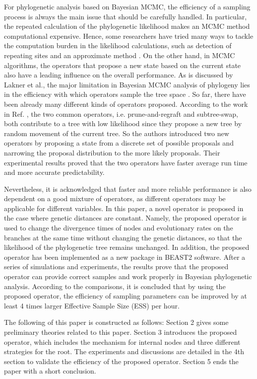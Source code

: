 \documentclass{bmcart}
\begin{document}
For phylogenetic analysis based on Bayesian MCMC, the efficiency of a sampling process is always the main issue that should be carefully handled. In particular, the repeated calculation of the phylogenetic likelihood makes an MCMC method computational expensive. Hence, some researchers have tried many ways to tackle the computation burden in the likelihood calculations, such as detection of repeating sites \cite{kobert2017efficient} and an approximate method \cite{reis2011approximate}. On the other hand, in MCMC algorithms, the operators that propose a new state based on the current state also have a leading influence on the overall performance. As is discussed by Lakner et al., the major limitation in Bayesian MCMC analysis of phylogeny lies in the efficiency with which operators sample the tree space \cite{lakner2008efficiency}. So far, there have been already many different kinds of operators proposed. According to the work in Ref. \cite{hohna2011guided}, the two common operators, i.e. prune-and-regraft and subtree-swap, both contribute to a tree with low likelihood since they propose a new tree by random movement of the current tree. So the authors introduced two new operators by proposing a state from a discrete set of possible proposals and narrowing the proposal distribution to the more likely proposals. Their experimental results proved that the two operators have faster average run time and more accurate predictability.

Nevertheless, it is acknowledged that faster and more reliable performance is also dependent on a good mixture of operators, as different operators may be applicable for different variables. In this paper, a novel operator is proposed in the case where genetic distances are constant. Namely, the proposed operator is used to change the divergence times of nodes and evolutionary rates on the branches at the same time without changing the genetic distances, so that the likelihood of the phylogenetic tree remains unchanged. In addition, the proposed operator has been implemented as a new package in BEAST2 software. After a series of simulations and experiments, the results prove that the proposed operator can provide correct samples  and work properly in Bayesian phylogenetic analysis. According to the comparisons, it is concluded that by using the proposed operator, the efficiency of sampling parameters can be improved by at least 4 times larger Effective Sample Size (ESS) per hour.

The following of this paper is constructed as follows: Section 2 gives some preliminary theories related to this paper. Section 3 introduces the proposed operator, which includes the mechanism for internal nodes and three different strategies for the root. The experiments and discussions are detailed in the 4th section to validate the efficiency of the proposed operator. Section 5 ends the paper with a short conclusion.
\end{document}
